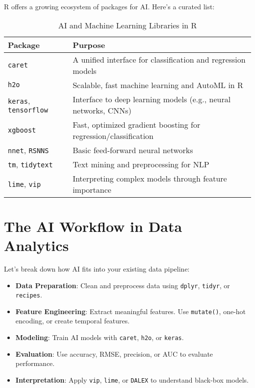 R offers a growing ecosystem of packages for AI. Here’s a curated list:

\begin{table}[h!]
\centering
\begin{tabular}{|p{4cm}|p{9cm}|}
\hline
\textbf{Package} & \textbf{Purpose} \\
\hline
\texttt{caret} & A unified interface for classification and regression models \\
\hline
\texttt{h2o} & Scalable, fast machine learning and AutoML in R \\
\hline
\texttt{keras}, \texttt{tensorflow} & Interface to deep learning models (e.g., neural networks, CNNs) \\
\hline
\texttt{xgboost} & Fast, optimized gradient boosting for regression/classification \\
\hline
\texttt{nnet}, \texttt{RSNNS} & Basic feed-forward neural networks \\
\hline
\texttt{tm}, \texttt{tidytext} & Text mining and preprocessing for NLP \\
\hline
\texttt{lime}, \texttt{vip} & Interpreting complex models through feature importance \\
\hline
\end{tabular}
\caption{AI and Machine Learning Libraries in R}
\end{table}

\section{The AI Workflow in Data Analytics}

Let’s break down how AI fits into your existing data pipeline:

\begin{itemize}
  \item \textbf{Data Preparation}: Clean and preprocess data using \texttt{dplyr}, \texttt{tidyr}, or \texttt{recipes}.
  \item \textbf{Feature Engineering}: Extract meaningful features. Use \texttt{mutate()}, one-hot encoding, or create temporal features.
  \item \textbf{Modeling}: Train AI models with \texttt{caret}, \texttt{h2o}, or \texttt{keras}.
  \item \textbf{Evaluation}: Use accuracy, RMSE, precision, or AUC to evaluate performance.
  \item \textbf{Interpretation}: Apply \texttt{vip}, \texttt{lime}, or \texttt{DALEX} to understand black-box models.
\end{itemize}

